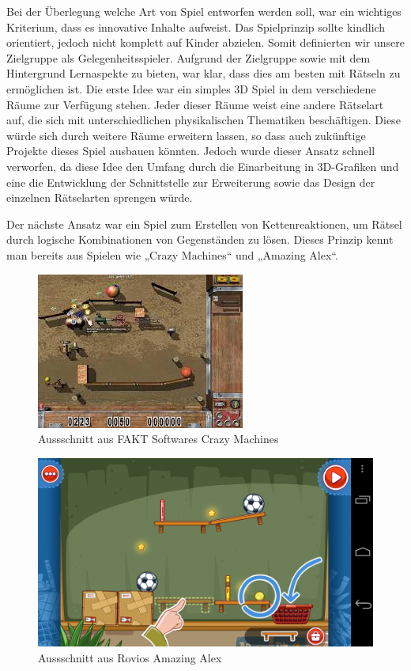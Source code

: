 Bei der Überlegung welche Art von Spiel entworfen werden soll, war ein wichtiges Kriterium, dass es innovative Inhalte aufweist. Das Spielprinzip sollte kindlich orientiert, jedoch nicht komplett auf Kinder abzielen. Somit definierten wir unsere Zielgruppe als  Gelegenheitsspieler. Aufgrund der Zielgruppe sowie mit dem Hintergrund Lernaspekte zu bieten, war klar, dass dies am besten mit Rätseln zu ermöglichen ist. Die erste Idee war ein simples 3D Spiel in dem verschiedene Räume zur Verfügung stehen. Jeder dieser Räume weist eine andere Rätselart auf, die sich mit unterschiedlichen physikalischen Thematiken beschäftigen. Diese würde sich durch weitere Räume erweitern lassen, so dass auch zukünftige Projekte dieses Spiel ausbauen könnten. Jedoch wurde dieser Ansatz schnell verworfen, da diese Idee den Umfang  durch die Einarbeitung in 3D-Grafiken  und eine die Entwicklung der Schnittstelle zur Erweiterung sowie das Design der einzelnen Rätselarten sprengen würde.

Der nächste Ansatz war ein Spiel zum Erstellen von Kettenreaktionen, um Rätsel durch logische Kombinationen von Gegenständen zu lösen. Dieses Prinzip kennt man bereits aus Spielen wie „Crazy Machines“ und „Amazing Alex“.
 
 \begin{figure}[H]
    \centering
    \includegraphics[scale=1, center]{res/crazy_machines.jpg}
    \caption[Aussschnitt aus FAKT Softwares  Crazy Machines]{Aussschnitt aus FAKT Softwares  Crazy Machines\footnotemark}
    \label{Crazy_Machines}
\end{figure}

\begin{figure}[H]
    \centering
    \includegraphics[scale=0.35, center]{res/Amazing_Alex.png}
    \caption[Aussschnitt aus Rovios Amazing Alex]{Aussschnitt aus Rovios Amazing Alex\footnotemark}
    \label{Amazing Alex}
\end{figure}

